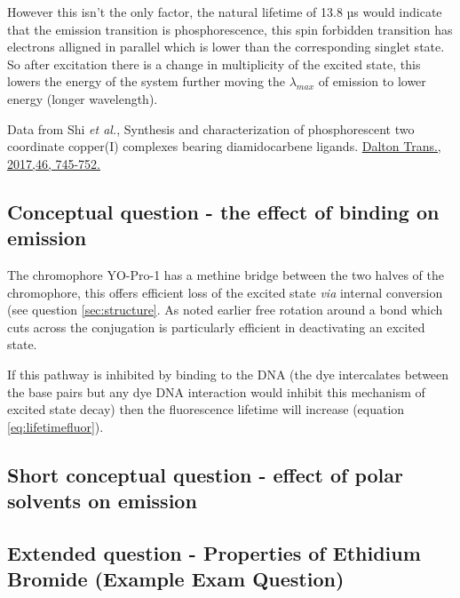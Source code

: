 \documentclass[
]{book}
\begin{document}
However this isn't the only factor, the natural lifetime of 13.8 µs would indicate that the emission transition is phosphorescence, this spin forbidden transition has electrons alligned in parallel which is lower than the corresponding singlet state. So after excitation there is a change in multiplicity of the excited state, this lowers the energy of the system further moving the \(\lambda _{max}\) of emission to lower energy (longer wavelength).

Data from Shi \emph{et al.}, Synthesis and characterization of phosphorescent two coordinate copper(I) complexes bearing diamidocarbene ligands. \href{https://doi.org/10.1039/C6DT04016K}{Dalton Trans., 2017,46, 745-752.}

\hypertarget{sec:bindingans}{%
\subsection{Conceptual question - the effect of binding on emission}\label{sec:bindingans}}

The chromophore YO-Pro-1 has a methine bridge between the two halves of the chromophore, this offers efficient loss of the excited state \emph{via} internal conversion (see question \ref{sec:structure}. As noted earlier free rotation around a bond which cuts across the conjugation is particularly efficient in deactivating an excited state.

If this pathway is inhibited by binding to the DNA (the dye intercalates between the base pairs but any dye DNA interaction would inhibit this mechanism of excited state decay) then the fluorescence lifetime will increase (equation \eqref{eq:lifetimefluor}).

\hypertarget{sec:polarsolvans}{%
\subsection{Short conceptual question - effect of polar solvents on emission}\label{sec:polarsolvans}}

\hypertarget{sec:examethidiumans}{%
\subsection{Extended question - Properties of Ethidium Bromide (Example Exam Question)}\label{sec:examethidiumans}}
\end{document}
